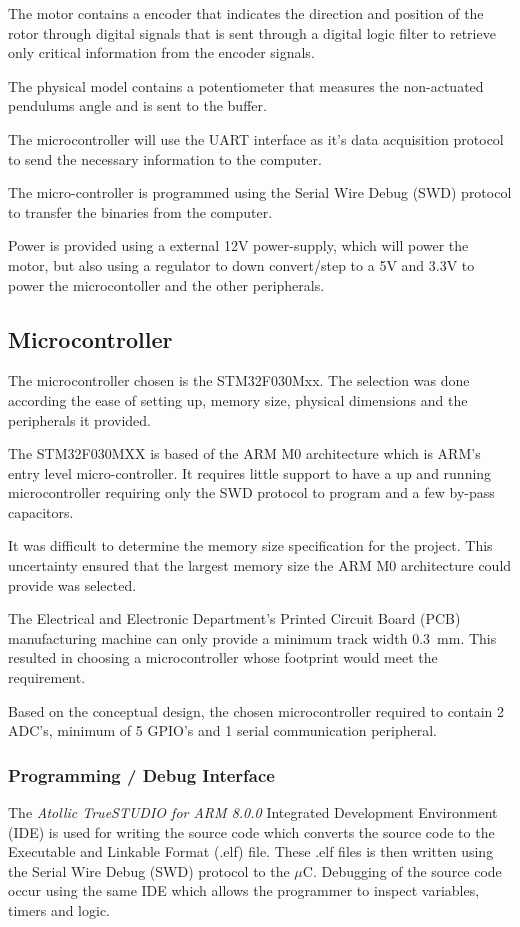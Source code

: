 The motor contains a encoder that indicates the direction and position of the rotor through digital signals that is sent through a digital logic filter to retrieve only critical information from the encoder signals. 

The physical model contains a potentiometer that measures the non-actuated pendulums angle and is sent to the buffer.

The microcontroller will use the UART interface as it's data acquisition protocol to send the necessary information to the computer. 

The micro-controller is programmed using the Serial Wire Debug (SWD) protocol to transfer the binaries from the computer.

Power is provided using a external 12V power-supply, which will power the motor, but also using a regulator to down convert/step to a 5V and 3.3V to power the microcontoller and the other peripherals.


\subsection{Microcontroller}
The microcontroller chosen is the STM32F030Mxx. The selection was done according the ease of setting up, memory size, physical dimensions and the peripherals it provided.

The STM32F030MXX is based of the ARM M0 architecture which is ARM's entry level micro-controller. It requires little support to have a up and running microcontroller requiring only the SWD protocol to program and a few by-pass capacitors.

It was difficult to determine the memory size specification for the project. This uncertainty ensured that the largest memory size the ARM M0 architecture could provide was selected.

The Electrical and Electronic Department's Printed Circuit Board (PCB) manufacturing machine can only provide a  minimum track width \SI{0.3}{mm}. This resulted in choosing a microcontroller whose footprint would meet the requirement.

Based on the conceptual design, the chosen microcontroller required to contain 2 ADC's, minimum of 5 GPIO's and 1 serial communication peripheral.

\subsubsection{Programming / Debug Interface}
The \textit{Atollic TrueSTUDIO for ARM 8.0.0} Integrated Development Environment (IDE) is used for writing the source code which converts the source code to the Executable and Linkable Format (.elf) file. These .elf files is then written using the Serial Wire Debug (SWD) protocol to the $\mu$C. Debugging of the source code occur using the same IDE which allows the programmer to inspect variables, timers and logic.

